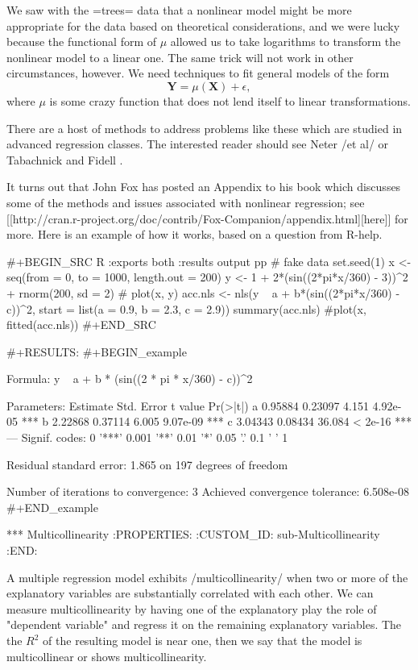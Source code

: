 We saw with the =trees= data that a nonlinear model might be more
appropriate for the data based on theoretical considerations, and we
were lucky because the functional form of \(\mu\) allowed us to take
logarithms to transform the nonlinear model to a linear one. The same
trick will not work in other circumstances, however. We need
techniques to fit general models of the form
\begin{equation}
\mathbf{Y}=\mu(\mathbf{X})+\epsilon,
\end{equation}
where \(\mu\) is some crazy function that does not lend itself to
linear transformations.

There are a host of methods to address problems like these which are
studied in advanced regression classes. The interested reader should
see Neter /et al/ \cite{Neter1996} or Tabachnick and Fidell
\cite{Tabachnick2006}.

It turns out that John Fox has posted an Appendix to his book
\cite{Fox2002} which discusses some of the methods and issues
associated with nonlinear regression; see [[http://cran.r-project.org/doc/contrib/Fox-Companion/appendix.html][here]] for more.  Here is an
example of how it works, based on a question from R-help.

#+BEGIN_SRC R :exports both :results output pp
# fake data 
set.seed(1) 
x <- seq(from = 0, to = 1000, length.out = 200) 
y <- 1 + 2*(sin((2*pi*x/360) - 3))^2 + rnorm(200, sd = 2)
# plot(x, y)
acc.nls <- nls(y ~ a + b*(sin((2*pi*x/360) - c))^2, 
               start = list(a = 0.9, b = 2.3, c = 2.9))
summary(acc.nls)
#plot(x, fitted(acc.nls))
#+END_SRC

#+RESULTS:
#+BEGIN_example

Formula: y ~ a + b * (sin((2 * pi * x/360) - c))^2

Parameters:
  Estimate Std. Error t value Pr(>|t|)    
a  0.95884    0.23097   4.151 4.92e-05 ***
b  2.22868    0.37114   6.005 9.07e-09 ***
c  3.04343    0.08434  36.084  < 2e-16 ***
---
Signif. codes:  0 '***' 0.001 '**' 0.01 '*' 0.05 '.' 0.1 ' ' 1

Residual standard error: 1.865 on 197 degrees of freedom

Number of iterations to convergence: 3 
Achieved convergence tolerance: 6.508e-08
#+END_example

*** Multicollinearity
:PROPERTIES:
:CUSTOM_ID: sub-Multicollinearity
:END:

A multiple regression model exhibits /multicollinearity/ when two or
more of the explanatory variables are substantially correlated with
each other. We can measure multicollinearity by having one of the
explanatory play the role of "dependent variable" and regress it on
the remaining explanatory variables. The the \(R^{2}\) of the
resulting model is near one, then we say that the model is
multicollinear or shows multicollinearity.

